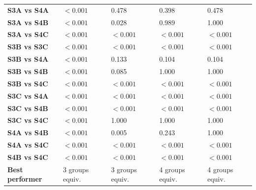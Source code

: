 \begin{table}[H]
{\begin{tabular}{lllll}
        \textbf{S3A vs S4A} & $< 0.001$ & 0.478 & 0.398 & 0.478 \\
        \textbf{S3A vs S4B} & $< 0.001$ & 0.028 & 0.989 & 1.000 \\
        \textbf{S3A vs S4C} & $< 0.001$ & $< 0.001$ & $< 0.001$ & $< 0.001$ \\
        \textbf{S3B vs S3C} & $< 0.001$ & $< 0.001$ & $< 0.001$ & $< 0.001$ \\
        \textbf{S3B vs S4A} & $< 0.001$ & 0.133 & 0.104 & 0.104 \\
        \textbf{S3B vs S4B} & $< 0.001$ & 0.085 & 1.000 & 1.000 \\
        \textbf{S3B vs S4C} & $< 0.001$ & $< 0.001$ & $< 0.001$ & $< 0.001$ \\
        \textbf{S3C vs S4A} & $< 0.001$ & $< 0.001$ & $< 0.001$ & $< 0.001$ \\
        \textbf{S3C vs S4B} & $< 0.001$ & $< 0.001$ & $< 0.001$ & $< 0.001$ \\
        \textbf{S3C vs S4C} & $< 0.001$ & 1.000 & 1.000 & 1.000 \\
        \textbf{S4A vs S4B} & $< 0.001$ & 0.005 & 0.243 & 1.000 \\
        \textbf{S4A vs S4C} & $< 0.001$ & $< 0.001$ & $< 0.001$ & $< 0.001$ \\
        \textbf{S4B vs S4C} & $< 0.001$ & $< 0.001$ & $< 0.001$ & $< 0.001$ \\
        \textbf{Best performer} & 3 groups equiv. & 3 groups equiv. & 4 groups equiv. & 4 groups equiv. \\
        \bottomrule
    \end{tabular}}
\end{table}